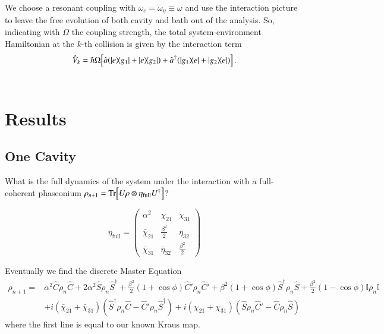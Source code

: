 \documentclass[entropy,article,submit,pdftex,moreauthors]{Definitions/mdpi}
\renewcommand{\a}{\hat{a}}
\newcommand{\ad}{\hat{a}^\dagger}
\newcommand{\idd}{\mathbb{I}}
\newcommand{\C}{\hat{C}}
\newcommand{\Cp}{\hat{C}'}
\newcommand{\Sd}{\hat{S}^\dagger}
\renewcommand{\S}{\hat{S}}
\begin{document}
We choose a resonant coupling with $\omega_c = \omega_\eta \equiv \omega$ and use the interaction picture to leave the free evolution of both cavity and bath out of the analysis.
So, indicating with $\Omega$ the coupling strength, the total system-environment Hamiltonian at the $k$-th collision is given by the interaction term
\begin{equation}\label{def:interaction}
    \hat{V}_k = \hbar\Omega\left[ \a(\dyad{e}{g_1}+\dyad{e}{g_2}) + \ad(\dyad{g_1}{e}+\dyad{g_2}{e}) \right] \,.
\end{equation}
\\

\section{Results}
\subsection{One Cavity}
\newpage
What is the full dynamics of the system under the interaction with a full-coherent phaseonium $\rho_{n+1}=\Tr\left[U\rho\otimes\eta_{\text{full}}U^\dagger\right]$?

\begin{equation}
    \eta_{\text{full}} = \begin{pmatrix}
        \alpha^2 & \chi_{21} & \chi_{31} \\
        \bar{\chi}_{21} & \frac{\beta^2}{2} & \eta_{32} \\
        \bar{\chi}_{31} & \bar{\eta}_{32} & \frac{\beta^2}{2}  
    \end{pmatrix}
\end{equation}

%
\vspace{5pt}

Eventually we find the discrete Master Equation
\begin{equation}\label{eq:full-coherent-map}
\begin{split}
    \rho_{n+1} =&
    \alpha^2\C\rho_n\C 
    +2\alpha^2\S\rho_n\Sd 
    +\frac{\beta^2}{2}(1+\cos\phi)\Cp\rho_n\Cp
    +\beta^2(1+\cos\phi)\Sd\rho_n\S 
    +\frac{\beta^2}{2}(1 - \cos\phi)\idd\rho_n\idd
    \\
    &+i(\bar{\chi}_{21}+\bar{\chi}_{31})(\Sd\rho_n\C - \Cp\rho_n\Sd)
    +i(\chi_{21}+\chi_{31})(\S\rho_n\Cp - \C\rho_n\S)
\end{split}
\end{equation}
where the first line is equal to our known Kraus map.
\end{document}
